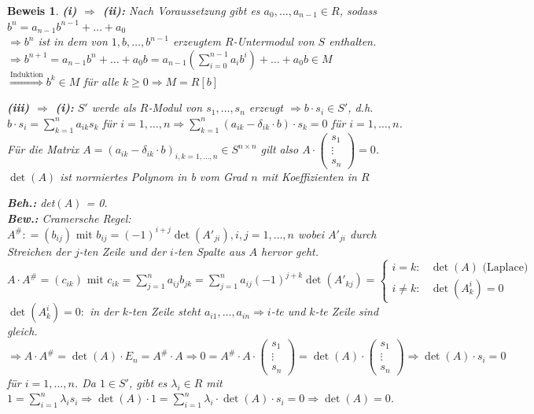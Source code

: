 \documentclass[a4paper,12pt]{scrbook}
\theoremstyle{break}
\theoremstyle{nonumberbreak}
\newtheorem{Bew}{Beweis}
\theoremstyle{nonumberplain}
\newcommand{\defeqr}[0]{\mathrel{\mathop:}=}
\begin{document}
\begin{Bew} 
  \textbf{(i) $\Rightarrow$ (ii):} Nach Voraussetzung gibt es $a_0, \dots ,
  a_{n-1} \in R$, sodass $b^n = a_{n-1}
  b^{n-1} + \dots + a_0$\\
  $\Rightarrow b^n$ ist in dem von $1, b, \dots , b^{n-1}$
  erzeugtem $R$-Untermodul von $S$ enthalten.\\
  $\Rightarrow b^{n+1} = a_{n-1} b^n + \dots + a_0 b = a_{n-1}
  (\sum_{i=0}^{n-1} a_i b^i) + \dots + a_0 b \in M$\\
  $\overset{\text{Induktion}}{\Rightarrow} b^k \in M$ für alle $k \ge
  0 \Rightarrow M = R[b]$

  \textbf{(iii) $\Rightarrow$ (i):} $S'$ werde als $R$-Modul von $s_1, \dots ,
  s_n$ erzeugt $\Rightarrow b \cdot s_i \in S'$, d.h. $b \cdot s_i = \sum_{k =
    1}^n a_{i k} s_k$ für $i=1,\dots,n \Rightarrow \sum_{k = 1}^n (a_{i k}
  -\delta_{i k} \cdot b) \cdot s_k = 0$ für
  $i=1, \dots, n$.\\
  Für die Matrix $A = (a_{i k} - \delta_{i k} \cdot b)_{i,k =1, \dots, n} \in S
  ^{n \times n}$ gilt also $A \cdot \begin{pmatrix}s_1 \\ \vdots \\ s_n
  \end{pmatrix} = 0$.
  $\det(A)$ ist normiertes Polynom in b vom Grad $n$ mit Koeffizienten in $R$

  \textbf{Beh.:} det$(A)$ = 0.\\
  \textbf{Bew.:} Cramersche Regel:\\
  $A^{\#} \defeqr (b_{i j}) \text{ mit } b_{i j} = (-1)^{i+j} \det(A'_{j
  i}), i,j= 1, \dots, n$ wobei $A'_{j i}$ durch Streichen der $j$-ten Zeile und
  der $i$-ten Spalte aus $A$ hervor geht.\\
  $A \cdot A^{\#} = (c_{i k}) \text{ mit } c_{i k} = \sum_{j = 1}^n a_{i j} b_{j
  k} = \sum_{j = 1}^n a_{i j} (-1)^{j+k} \det(A'_{k j}) = \begin{cases}
  i=k: & \det(A) \text{ (Laplace)}\\
  i \not= k: & \det(A_k^i) = 0
  \end{cases}$\\
  $\det(A_k^i) = 0:$ in der $k$-ten Zeile steht $a_{i 1}, \dots , a_{i n}
  \Rightarrow i$-te und $k$-te Zeile sind gleich.\\
  $\Rightarrow A \cdot A^{\#} = \det(A) \cdot E_n = A^{\#} \cdot A
  \Rightarrow 0 = A^{\#} \cdot A \cdot \begin{pmatrix}s_1 \\ \vdots \\ s_n 
  \end{pmatrix} = \det(A) \cdot \begin{pmatrix}s_1 \\ \vdots \\ s_n 
  \end{pmatrix} \Rightarrow \det(A) \cdot s_i = 0$ für $i = 1, \dots,
  n$.
  Da $1 \in S'$, gibt es $\lambda_i \in R$ mit $1 = \sum_{i=1}^n \lambda_i s_i
  \Rightarrow \det(A) \cdot 1 = \sum_{i=1}^n \lambda_i \cdot \det(A)
  \cdot s_i = 0 \Rightarrow \det(A) = 0$.
\end{Bew}
\end{document}
